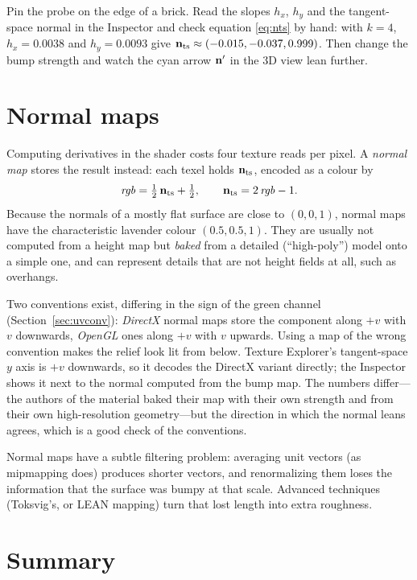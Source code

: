 \begin{tryit}
Pin the probe on the edge of a brick. Read the slopes $h_x$, $h_y$ and the tangent-space
normal in the Inspector and check equation \eqref{eq:nts} by hand: with $k=4$,
$h_x=0.0038$ and $h_y=0.0093$ give $\mathbf{n}_{\mathrm{ts}}\approx(-0.015,-0.037,0.999)$. Then change the bump
strength and watch the cyan arrow $\mathbf{n}'$ in the 3D view lean further.
\end{tryit}

\section{Normal maps}
\label{sec:normalmaps}

Computing derivatives in the shader costs four texture reads per pixel. A \emph{normal map}
stores the result instead: each texel holds $\mathbf{n}_{\mathrm{ts}}$, encoded as a colour by
\[
  \mathit{rgb} = \tfrac12\,\mathbf{n}_{\mathrm{ts}} + \tfrac12,\qquad \mathbf{n}_{\mathrm{ts}} = 2\,\mathit{rgb}-1 .
\]
Because the normals of a mostly flat surface are close to $(0,0,1)$, normal maps have the
characteristic lavender colour $(0.5,0.5,1)$. They are usually not computed from a height map
but \emph{baked} from a detailed (``high-poly'') model onto a simple one, and can represent
details that are not height fields at all, such as overhangs.

Two conventions exist, differing in the sign of the green channel (Section~\ref{sec:uvconv}):
\emph{DirectX} normal maps store the component along $+v$ with $v$ downwards, \emph{OpenGL}
ones along $+v$ with $v$ upwards. Using a map of the wrong convention makes the relief look
lit from below. Texture Explorer's tangent-space $y$ axis is $+v$ downwards, so it decodes the
DirectX variant directly; the Inspector shows it next to the normal computed from the bump
map. The numbers differ---the authors of the material baked their map with their own strength
and from their own high-resolution geometry---but the direction in which the normal leans
agrees, which is a good check of the conventions.

Normal maps have a subtle filtering problem: averaging unit vectors (as mipmapping does)
produces shorter vectors, and renormalizing them loses the information that the surface was
bumpy at that scale. Advanced techniques (Toksvig's, or LEAN mapping) turn that lost length into
extra roughness.

\section{Summary}

